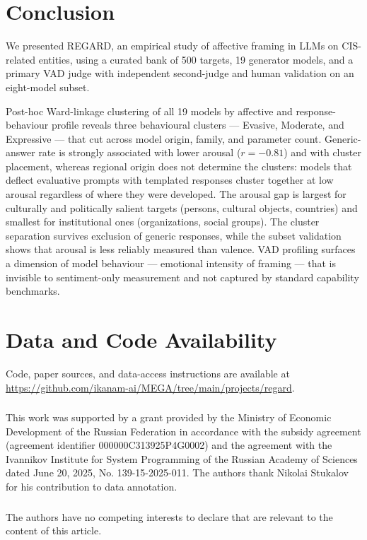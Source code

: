 \documentclass[runningheads,a4paper]{llncs}
\begin{document}
\section{Conclusion}
\label{sec:conclusion}

We presented REGARD, an empirical study of affective framing in LLMs
on CIS-related entities, using a curated bank of 500 targets, 19 generator
models, and a primary VAD judge with independent second-judge and human
validation on an eight-model subset.

Post-hoc Ward-linkage clustering of all 19 models by affective and response-behaviour profile reveals
three behavioural clusters --- Evasive, Moderate, and Expressive ---
that cut across model origin, family, and parameter count.
Generic-answer rate is strongly associated with lower arousal ($r = -0.81$) and with cluster placement, whereas regional origin does not determine the clusters: models that deflect
evaluative prompts with templated responses cluster together at low arousal
regardless of where they were developed.
The arousal gap is largest for culturally and politically salient targets
(persons, cultural objects, countries) and smallest for institutional ones
(organizations, social groups).
The cluster separation survives exclusion of generic responses, while the
subset validation shows that arousal is less reliably measured than valence.
VAD profiling surfaces a dimension of model behaviour --- emotional
intensity of framing --- that is invisible to sentiment-only measurement
and not captured by standard capability benchmarks.

\section*{Data and Code Availability}
Code, paper sources, and data-access instructions are available at
\url{https://github.com/ikanam-ai/MEGA/tree/main/projects/regard}.

\FloatBarrier
\begin{credits}
\subsubsection{\ackname}
This work was supported by a grant provided by the Ministry of Economic
Development of the Russian Federation in accordance with the subsidy agreement
(agreement identifier 000000C313925P4G0002) and the agreement with the Ivannikov
Institute for System Programming of the Russian Academy of Sciences dated
June 20, 2025, No. 139-15-2025-011. The authors thank Nikolai Stukalov for his
contribution to data annotation.

\subsubsection{\discintname}
The authors have no competing interests to declare that are relevant to the
content of this article.
\end{credits}



\end{document}

